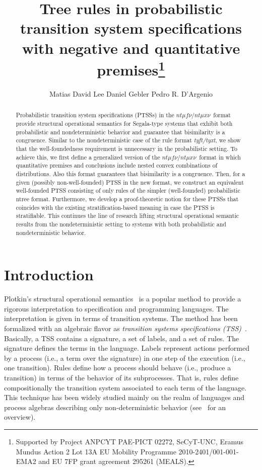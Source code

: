 \documentclass[submission,copyright,creativecommons]{eptcs}
\title{Tree rules in probabilistic transition system specifications with negative and quantitative premises\thanks{Supported by Project ANPCYT PAE-PICT 02272, SeCyT-UNC, 
                 Eramus Mundus Action 2 Lot 13A EU Mobility Programme 2010-2401/001-001-EMA2 and EU 7FP grant agreement 295261 (MEALS).}}
\author{
Matias David Lee  \qquad\qquad
Daniel Gebler  \qquad\qquad
Pedro R. D'Argenio
\and
\institute{FaMAF -- CONICET \\Universidad Nacional de C\'ordoba\\Ciudad Universitaria, X5000HUA C\'ordoba \\ Argentina}
\email{\{lee,dargenio\}@famaf.unc.edu.ar}
\and
\institute{Department of Computer Science\\VU University Amsterdam \\ De Boelelaan 1081a, 1081HV Amsterdam \\ The Netherlands}
\email{e.d.gebler@vu.nl}
\ifdraft
\and\institute{\wipinfo}
\fi
}
\newcommand{\ntmufnu}{\ensuremath{\textit{nt}\mu\textit{f}\nu}}
\newcommand{\ntmuxnu}{\ensuremath{\textit{nt}\mu\textit{x}\nu}}
\newcommand{\ntmufxnu}{\ensuremath{\ntmufnu\textit{/}\ntmuxnu}}
\begin{document}
\maketitle

\begin{abstract}
Probabilistic transition system specifications (PTSSs) in the
\ntmufxnu\ format provide structural operational semantics for
Segala-type systems that exhibit both probabilistic and
nondeterministic behavior and guarantee that bisimilarity is a
congruence.
Similar to the nondeterministic case of the rule format {\it tyft/tyxt}, we
show that the well-foundedness requirement is unnecessary in the
probabilistic setting.
To achieve this, we first define a generalized version of the
\ntmufxnu\ format in which quantitative premises and conclusions
include nested convex combinations of distributions.  
Also this format guarantees that bisimilarity
is a congruence.
Then, for a given (possibly non-well-founded) PTSS in the new format,
we construct an equivalent well-founded PTSS consisting
of only rules of the simpler (well-founded) probabilistic ntree
format.
Furthermore, we develop a proof-theoretic
notion for these PTSSs that coincides with the existing stratification-based meaning
in case the PTSS is stratifiable. This
continues the line of research lifting structural operational semantic
results from the nondeterministic setting to systems with both
probabilistic and nondeterministic behavior.
\end{abstract}

\section{Introduction}


Plotkin's structural operational semantics~\cite{Plotkin81} is a
popular method to provide 
a rigorous interpretation to specification and programming languages. The interpretation 
is given in terms of transition systems.
The method has been formalized with an algebraic flavor as \emph{transition
  systems specifications
  (TSS)}~\cite[etc.]{GrooteVaandrager92,BloomIM95:jacm,Groote93,BolGroote96}.
Basically, a TSS contains a signature, a set of labels, and a set of
rules. The signature defines the terms in the language.  Labels
represent actions performed by a process (i.e., a term over the
signature) in one step of the execution (i.e., one transition).
Rules define how a process should behave (i.e., produce a transition)
in terms of the behavior of its subprocesses. 
That is, rules define
compositionally the transition system associated to each term of the
language.
This technique has been widely studied mainly on the realm of
languages and process algebras describing only non-deterministic
behavior (see~\cite{MousaviEtAl07} for an overview).
\end{document}
